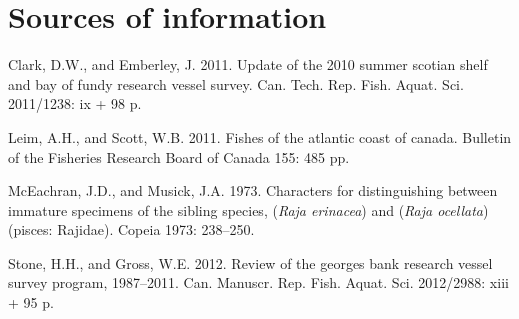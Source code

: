 \documentclass[11pt]{book}
\begin{document}
\MakeApproval

\hypertarget{sources-of-information}{%
\section{Sources of information}\label{sources-of-information}}

\noindent
\vspace{-2em}
\setlength{\parindent}{-0.2in}
\setlength{\leftskip}{0.2in}
\setlength{\parskip}{8pt}

\hypertarget{refs}{}
\leavevmode\hypertarget{ref-ClarkEmberley2011}{}%
Clark, D.W., and Emberley, J. 2011. Update of the 2010 summer scotian shelf and bay of fundy research vessel survey. Can. Tech. Rep. Fish. Aquat. Sci. 2011/1238: ix + 98 p.

\leavevmode\hypertarget{ref-LeimScott1966}{}%
Leim, A.H., and Scott, W.B. 2011. Fishes of the atlantic coast of canada. Bulletin of the Fisheries Research Board of Canada 155: 485 pp.

\leavevmode\hypertarget{ref-McEachran1973}{}%
McEachran, J.D., and Musick, J.A. 1973. Characters for distinguishing between immature specimens of the sibling species, (\emph{Raja erinacea}) and (\emph{Raja ocellata}) (pisces: Rajidae). Copeia 1973: 238--250.

\leavevmode\hypertarget{ref-StoneGross2012}{}%
Stone, H.H., and Gross, W.E. 2012. Review of the georges bank research vessel survey program, 1987--2011. Can. Manuscr. Rep. Fish. Aquat. Sci. 2012/2988: xiii + 95 p.

\clearpage
\end{document}
